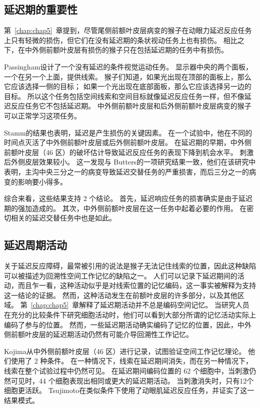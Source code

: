 \subsection{延迟期的重要性}

第~\ref{chap:chap5}~章提到，尽管尾侧前额叶皮层病变的猴子在动眼力延迟反应任务上只有轻微的损伤，但它们在没有延迟期的条状视动任务上也有损伤。
相比之下，在中外侧前额叶皮层有损伤的猴子只在包括延迟期的任务中有损伤。


Passingham\cite{passingham1985memory}设计了一个没有延迟的条件视觉运动任务。
显示器中央的两个面板，一个在另一个上面，提供线索。
猴子们知道，如果光出现在顶部的面板上，那么它应该选择一侧的目标；
如果一个光出现在底部面板，那么它应该选择另一边的目标。
所以这个任务包括空间线索和空间目标就像延迟反应任务一样，但不像延迟反应任务它不包括延迟期。
中外侧前额叶皮层和后外侧前额叶皮层病变的猴子可以正常学习这项任务。


Stamm\cite{stamm1969electrical}的结果也表明，延迟是产生损伤的关键因素。
在一个试验中，他在不同的时间点灭活了中外侧前额叶皮层或后外侧前额叶皮层。
在延迟期的早期，中外侧前额叶皮层（46 区）的破坏估计导致延迟反应任务的表现下降到机会水平。
刺激后外侧皮层效果较小。
这一发现与 Butters\cite{butters1969retention}的一项研究结果一致，他们在该研究中表明，主沟中央三分之一的病变导致延迟交替任务的严重损害，而后三分之一的病变的影响要小得多。


综合来看，这些结果支持 2 个结论。
首先，延迟响应任务的损害确实是由于延迟期的强加造成的。
其次，中外侧前额叶皮层在这一任务中起着必要的作用。
在密切相关的延迟交替任务中也是如此。



\subsection{延迟周期活动}

关于延迟反应障碍，最常被引用的说法是猴子无法记住线索的位置，因此这种缺陷可以被描述为回溯性空间工作记忆的缺陷之一。
人们可以记录下延迟期间的活动，而且乍一看，这种活动似乎是对线索位置的记忆编码，这一事实被解释为支持这一结论的证据。
然而，这种活动发生在前额叶皮层的许多部分，以及其他区域。
第~\ref{chap:chap5}~章解释了延迟期活动并不总是编码空间记忆。
当研究人员在充分的比较条件下研究细胞活动时，他们可以看到大部分所谓的记忆活动实际上编码了参与的位置。
然而，一些延迟期活动确实编码了记忆的位置，因此，中外侧前额叶皮层的延迟期活动仍然有可能介导回溯性工作记忆。


Kojima\cite{kojima1984functional}从中外侧前额叶皮层（46 区）进行记录，试图验证空间工作记忆理论。
他们使用了 2 种条件。
在一种情况下，线索在延迟期间消失，而在另一种情况下，线索在整个试验过程中仍然可见。
在延迟期间编码位置的 62 个细胞中，当刺激仍然可见时，44 个细胞表现出相同或更大的延迟期活动。
当刺激消失时，只有12个细胞更活跃。
Tsujimoto\cite{tsujimoto2004properties}在类似条件下使用了动眼肌延迟反应任务，并证实了这一结果模式。


